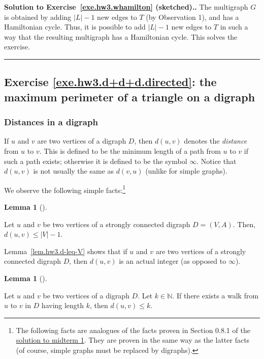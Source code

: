 \documentclass[numbers=enddot,12pt,final,onecolumn,notitlepage]{scrartcl}%
\newcounter{exer}
\theoremstyle{definition}
\newtheorem{lem}[theo]{Lemma}
\newenvironment{lemma}[1][]
{\begin{lem}[#1]\begin{leftbar}}
{\end{leftbar}\end{lem}}
\newenvironment{proof}[1][Proof]{\noindent\textbf{#1.} }{\ \rule{0.5em}{0.5em}}
\newcommand{\NN}{\mathbb{N}}
\newcommand{\abs}[1]{\left| #1 \right|}
\newcommand{\tup}[1]{\left( #1 \right)}
\begin{document}
\begin{proof}[Solution to Exercise~\ref{exe.hw3.whamilton}
(sketched).]
The multigraph $G$ is obtained by adding $\abs{L}-1$ new edges to $T$
(by Observation 1), and has a Hamiltonian cycle.
Thus, it is possible to add $\abs{L}-1$ new edges to $T$ in such a way
that the resulting multigraph has a Hamiltonian cycle.
This solves the exercise.
\end{proof}

\subsection{Exercise \ref{exe.hw3.d+d+d.directed}: the maximum
perimeter of a triangle on a digraph}

\subsubsection{Distances in a digraph}

If $u$ and $v$ are two vertices of a digraph $D$, then
$d \tup{u, v}$ denotes the \textit{distance} from $u$ to $v$. This
is defined to be the minimum length of a path from $u$ to $v$ if
such a path exists; otherwise it is defined to be the symbol $\infty$.
Notice that $d \tup{u, v}$ is not usually the same as $d \tup{v, u}$
(unlike for simple graphs).

We observe the following simple facts:\footnote{The following facts
  are analogues of the facts proven in Section 0.8.1 of the
  \href{http://www-users.math.umn.edu/~dgrinber/5707s17/mt1s.pdf}{solution to midterm 1}.
  They are proven in the same way as the latter facts
  (of course, simple graphs must be replaced by digraphs).}

\begin{lemma} \label{lem.hw3.d-leq-V}
Let $u$ and $v$ be two vertices of a strongly connected digraph
$D = \tup{V, A}$.
Then, $d \tup{u, v} \leq \abs{V} - 1$.
\end{lemma}

Lemma~\ref{lem.hw3.d-leq-V} shows that if $u$ and $v$ are two
vertices of a strongly connected digraph $D$, then $d \tup{u, v}$ is
an actual integer (as opposed to $\infty$).

\begin{lemma} \label{lem.hw3.walk-to-distance}
Let $u$ and $v$ be two vertices of a digraph $D$. Let
$k \in \NN$. If there exists a walk from $u$ to $v$ in $D$ having
length $k$, then $d \tup{u, v} \leq k$.
\end{lemma}
\end{document}
